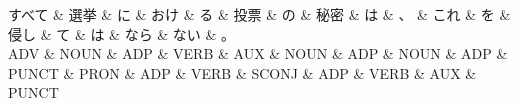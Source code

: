 \documentclass[tikz,border=5pt]{standalone}
\begin{document}
\normalsize
\begin{dependency}[edge unit distance=12.0pt]
    \begin{deptext}[column sep=1em]
        すべて \& 選挙 \& に \& おけ \& る \& 投票 \& の \& 秘密 \& は \& 、 \& これ \& を \& 侵し \& て \& は \& なら \& ない \& 。\\
        ADV \& NOUN \& ADP \& VERB \& AUX \& NOUN \& ADP \& NOUN \& ADP \& PUNCT \& PRON \& ADP \& VERB \& SCONJ \& ADP \& VERB \& AUX \& PUNCT\\
    \end{deptext}
\end{dependency}
\end{document}
